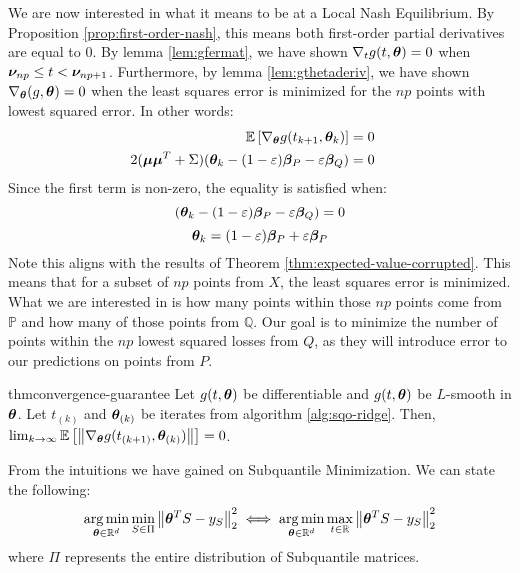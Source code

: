 \documentclass{article} %
\newenvironment{proofsketch}{%
	\renewcommand{\proofname}{Proof Sketch}\proof}{\endproof}
\newcommand{\norm}[1]{\left\lVert#1\right\rVert}
\begin{document}
	We are now interested in what it means to be at a Local Nash Equilibrium. By Proposition \ref{prop:first-order-nash}, this means both first-order partial derivatives are equal to $0$. By lemma \ref{lem:gfermat}, we have shown $\nabla_tg(t,{\bm{\theta}}) = 0$ when ${\bm{\nu}}_{np} \leq t < {\bm{\nu}}_{np+1}$. Furthermore, by lemma \ref{lem:gthetaderiv}, we have shown $\nabla_{\bm{\theta}}(g,{\bm{\theta}}) = 0$ when the least squares error is minimized for the $np$ points with lowest squared error. In other words:
	\begin{align*}
		\mathbb{E}\left[\nabla_{\bm{\theta}} g(t_{k+1},{\bm{\theta}}_k)\right] &= 0 &&\\
		2({\bm{\mu}}{\bm{\mu}}^T + \Sigma)({\bm{\theta}}_k - (1-\varepsilon){\bm{\beta}}_P-\varepsilon{\bm{\beta}}_Q) &= 0&&
	\end{align*}
	Since the first term is non-zero, the equality is satisfied when:
	\begin{equation*}
		({\bm{\theta}}_k - (1-\varepsilon){\bm{\beta}}_P-\varepsilon{\bm{\beta}}_Q) = 0
	\end{equation*}	
	\begin{equation*}
		{\bm{\theta}}_k = (1-\varepsilon){\bm{\beta}}_P + \varepsilon{\bm{\beta}}_P 
	\end{equation*}
	Note this aligns with the results of Theorem \ref{thm:expected-value-corrupted}.
	This means that for a subset of $np$ points from $X$, the least squares error is minimized. What we are interested in is how many points within those $np$ points come from $\mathbb{P}$ and how many of those points from $\mathbb{Q}$. Our goal is to minimize the number of points within the $np$ lowest squared losses from $Q$, as they will introduce error to our predictions on points from $P$. 
	
	
	
	\begin{restatable}{thm}{convergence-guarantee}
		\label{thm:convergence-guarantee}
		Let $g(t,{\bm{\theta}})$ be differentiable and $g(t,{\bm{\theta}})$ be $L$-smooth in ${\bm{\theta}}$. Let $t_{(k)}$ and ${\bm{\theta}}_{(k)}$ be iterates from algorithm \ref{alg:sqo-ridge}. Then, $\lim_{k \to \infty} \mathbb{E}\left[\norm{\nabla_\vtheta g(t_{(k+1)},\vtheta_{(k)})}\right] = 0$.
	\end{restatable}
	\begin{proofsketch}
		From the intuitions we have gained on Subquantile Minimization. We can state the following:
		\begin{equation}
			\argmin_{\vtheta \in \mathbb{R}^d}\min_{S \in \Pi}\norm{\vtheta^T S - y_S}_2^2 \iff \argmin_{\vtheta \in \mathbb{R}^d}\max_{t \in \mathbb{R}}\norm{\vtheta^T S - y_S}_2^2
		\end{equation}
		where $\Pi$ represents the entire distribution of Subquantile matrices. 
	\end{proofsketch}
	
\end{document}
